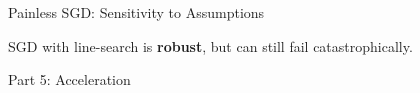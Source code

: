 \documentclass[mathserif,notheorems, hyperref={colorlinks, citecolor=blue, urlcolor=blue, linkcolor=blue}]{beamer}
\def\\{}%
\begin{document}
    \begin{frame}{Painless SGD: Sensitivity to Assumptions}

        SGD with line-search is \textbf{robust}, but can still fail catastrophically.

        \begin{figure}
        \end{figure}

    \end{frame}


    \begin{frame}
       \begin{center}
          \huge Part 5: Acceleration \\
       \end{center} 
    \end{frame}
    

\end{document}
